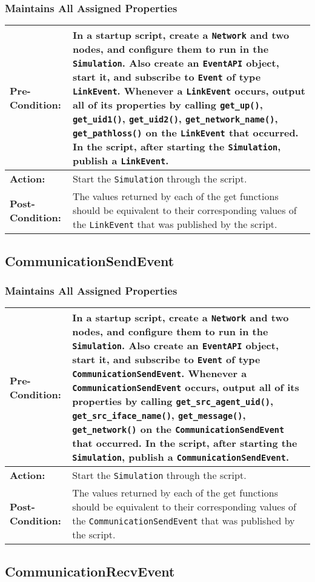 \documentclass[titlepage]{article}
\newcommand{\testcase}[3]{
    \begin{center}
    \begin{tabular}{| l | p{0.7\textwidth}|}
        \hline
        \rowcolor[gray]{0.8}\textbf{Pre-Condition:} & #1 \\ \hline
        \textbf{Action:} & #2 \\ \hline
        \rowcolor[gray]{0.8}\textbf{Post-Condition:} & #3 \\ \hline
    \end{tabular}
    \end{center}
}
\begin{document}
\subsubsection{Maintains All Assigned Properties}
\testcase{In a startup script, create a \texttt{Network} and two nodes, and configure them to run in the \texttt{Simulation}. Also create an \texttt{EventAPI} object, start it, and subscribe to \texttt{Event} of type \texttt{LinkEvent}. Whenever a \texttt{LinkEvent} occurs, output all of its properties by calling \texttt{get\_up()}, \texttt{get\_uid1()}, \texttt{get\_uid2()}, \texttt{get\_network\_name()}, \texttt{get\_pathloss()} on the \texttt{LinkEvent} that occurred. In the script, after starting the \texttt{Simulation}, publish a \texttt{LinkEvent}.}{Start the \texttt{Simulation} through the script.}{The values returned by each of the get functions should be equivalent to their corresponding values of the \texttt{LinkEvent} that was published by the script.}

\subsection{CommunicationSendEvent}
\subsubsection{Maintains All Assigned Properties}
\testcase{In a startup script, create a \texttt{Network} and two nodes, and configure them to run in the \texttt{Simulation}. Also create an \texttt{EventAPI} object, start it, and subscribe to \texttt{Event} of type \texttt{CommunicationSendEvent}. Whenever a \texttt{CommunicationSendEvent} occurs, output all of its properties by calling \texttt{get\_src\_agent\_uid()}, \texttt{get\_src\_iface\_name()}, \texttt{get\_message()}, \texttt{get\_network()} on the \texttt{CommunicationSendEvent} that occurred. In the script, after starting the \texttt{Simulation}, publish a \texttt{CommunicationSendEvent}.}{Start the \texttt{Simulation} through the script.}{The values returned by each of the get functions should be equivalent to their corresponding values of the \texttt{CommunicationSendEvent} that was published by the script.}

\subsection{CommunicationRecvEvent}
\end{document}
